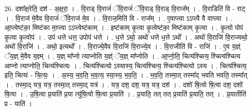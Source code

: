\documentclass[17pt]{extarticle}
\begin{document}
26. दशा᳚क्ष॒रेति॒ दश॑ - अ॒क्ष॒रा॒ । . वि॒राड् वि॒राजं॑ ॅवि॒राजं॑ ॅवि॒राड् वि॒राड् वि॒राज᳚म् । . वि॒राडिति॑ वि - राट् । . वि॒राज॑ मे॒वैव वि॒राजं॑ ॅवि॒राज॑ मे॒व । . वि॒राज॒मिति॑ वि - राज᳚म् । . ए॒वाप्त्वा ऽऽप्त्वै वै वाप्त्वा । . आ॒प्त्वेष्ट॑का॒ मिष्ट॑का मा॒प्त्वा ऽऽप्त्वेष्ट॑काम् । . इष्ट॑काम् कृ॒त्वा कृ॒त्वेष्ट॑का॒ मिष्ट॑काम् कृ॒त्वा । . कृ॒त्वो पोप॑ कृ॒त्वा कृ॒त्वोप॑ । . उप॑ धत्ते धत्त॒ उपोप॑ धत्ते । . ध॒त्ते ऽथो॒ अथो॑ धत्ते ध॒त्ते ऽथो᳚ । . अथो॑ वि॒राजि॑ वि॒राज्यथो॒ अथो॑ वि॒राजि॑ । . अथो॒ इत्यथो᳚ । . वि॒राज्ये॒वैव वि॒राजि॑ वि॒राज्ये॒व । . वि॒राजीति॑ वि - राजि॑ । . ए॒व य॒ज्ञ्ं ॅय॒ज्ञ् मे॒वैव य॒ज्ञ्म् । . य॒ज्ञ् मा᳚प्नो त्याप्नोति य॒ज्ञ्ं ॅय॒ज्ञ् मा᳚प्नोति । . आ॒प्नो॒ति॒ चित्य॑श्चित्य॒ श्चित्य॑श्चित्य आप्नो त्याप्नोति॒ चित्य॑श्चित्यः । . चित्य॑श्चित्यो ऽस्यास्य॒ चित्य॑श्चित्य॒ श्चित्य॑श्चित्यो ऽस्य । . चित्य॑श्चित्य॒ इति॒ चित्यः॑ - चि॒त्यः॒ । . अ॒स्य॒ भ॒व॒ति॒ भ॒व॒त्य॒ स्या॒स्य॒ भ॒व॒ति॒ । . भ॒व॒ति॒ तस्मा॒त् तस्मा᳚द् भवति भवति॒ तस्मा᳚त् । . तस्मा॒द् यत्र॒ यत्र॒ तस्मा॒त् तस्मा॒द् यत्र॑ । . यत्र॒ दश॒ दश॒ यत्र॒ यत्र॒ दश॑ । . दशो॑ षि॒त्वो षि॒त्वा दश॒ दशो॑ षि॒त्वा । . उ॒षि॒त्वा प्र॒याति॑ प्र॒या त्यु॑षि॒त्वो षि॒त्वा प्र॒याति॑ । . प्र॒याति॒ तत् तत् प्र॒याति॑ प्र॒याति॒ तत् । . प्र॒यातीति॑ प्र - याति॑ । \newline
\end{document}
